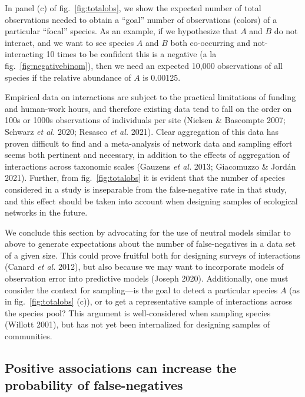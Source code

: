 \documentclass[11pt]{article}
\begin{document}
In panel (c) of fig.~\ref{fig:totalobs}, we show the expected number of
total observations needed to obtain a ``goal'' number of observations
(colors) of a particular ``focal'' species. As an example, if we
hypothesize that \(A\) and \(B\) do not interact, and we want to see
species \(A\) and \(B\) both co-occurring and not-interacting 10 times
to be confident this is a negative (a la fig.~\ref{fig:negativebinom}),
then we need an expected 10,000 observations of all species if the
relative abundance of \(A\) is 0.00125.

Empirical data on interactions are subject to the practical limitations
of funding and human-work hours, and therefore existing data tend to
fall on the order on 100s or 1000s observations of individuals per site
(Nielsen \& Bascompte 2007; Schwarz \emph{et al.} 2020; Resasco \emph{et
al.} 2021). Clear aggregation of this data has proven difficult to find
and a meta-analysis of network data and sampling effort seems both
pertinent and necessary, in addition to the effects of aggregation of
interactions across taxonomic scales (Gauzens \emph{et al.} 2013;
Giacomuzzo \& Jordán 2021). Further, from fig.~\ref{fig:totalobs} it is
evident that the number of species considered in a study is inseparable
from the false-negative rate in that study, and this effect should be
taken into account when designing samples of ecological networks in the
future.

We conclude this section by advocating for the use of neutral models
similar to above to generate expectations about the number of
false-negatives in a data set of a given size. This could prove fruitful
both for designing surveys of interactions (Canard \emph{et al.} 2012),
but also because we may want to incorporate models of observation error
into predictive models (Joseph 2020). Additionally, one must consider
the context for sampling---is the goal to detect a particular species
\(A\) (as in fig.~\ref{fig:totalobs} (c)), or to get a representative
sample of interactions across the species pool? This argument is
well-considered when sampling species (Willott 2001), but has not yet
been internalized for designing samples of communities.

\hypertarget{positive-associations-can-increase-the-probability-of-false-negatives}{%
\subsection{Positive associations can increase the probability of
false-negatives}\label{positive-associations-can-increase-the-probability-of-false-negatives}}
\end{document}
